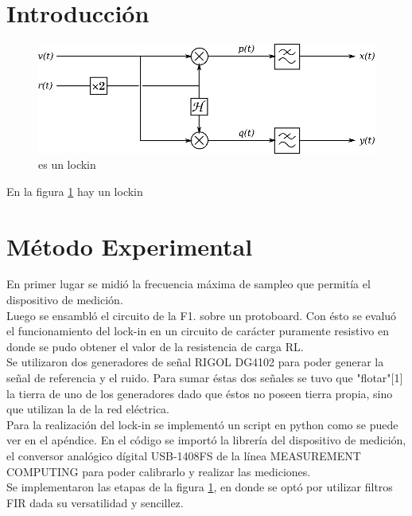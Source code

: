 \documentclass[11pt,a4paper]{extarticle}
\begin{document}
\begin{multicols}{2}
\section{Introducción}

\begin{figure}[H]
	\centering
	\includegraphics[width=\linewidth]{Images/lockin.eps}
	\caption{es un lockin}
	\label{fig:lockin}
\end{figure}


En la figura \ref{fig:lockin} hay un lockin

\section{Método Experimental}
En primer lugar se midió la frecuencia máxima de 
sampleo que permitía el dispositivo de medición.\\

Luego se ensambló el circuito de la F1. sobre 
un protoboard. Con ésto se evaluó el funcionamiento del
lock-in en un circuito de carácter puramente resistivo 
en donde se pudo obtener el valor de la resistencia 
de carga RL.\\ 

Se utilizaron dos generadores de señal RIGOL DG4102 
para poder generar la señal de referencia y el ruido.
Para sumar éstas dos señales se tuvo que "flotar"[1] la 
tierra de uno de los generadores dado que éstos no poseen 
tierra propia, sino que utilizan la de la red eléctrica.\\

Para la realización del lock-in se implementó un 
script en python como se puede ver en el apéndice.
En el código se importó la librería del dispositivo 
de medición, el 
conversor analógico dígital USB-1408FS de la línea 
MEASUREMENT COMPUTING para poder 
calibrarlo y realizar las mediciones.\\

Se implementaron 
las etapas de la figura \ref{fig:lockin}, en donde 
se optó por utilizar filtros FIR dada su versatilidad 
y sencillez.\\


\end{multicols}
\end{document}
